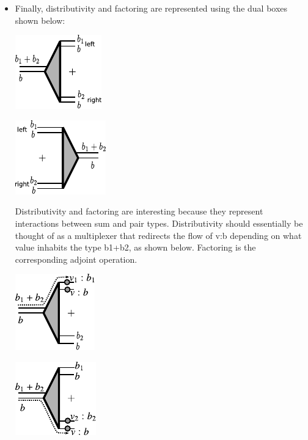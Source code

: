 \documentclass[preprint]{sigplanconf}
\begin{document}
\begin{itemize}
\item Finally, distributivity and factoring are represented using the dual
  boxes shown below:
\begin{multicols}{2}
\begin{center}
  \includegraphics{diagrams/thesis/dist.pdf}
\end{center}
\begin{center}
  \includegraphics{diagrams/thesis/factor.pdf}
\end{center}
\end{multicols}


Distributivity and factoring are interesting because they represent
interactions between sum and pair types. Distributivity should
essentially be thought of as a multiplexer that redirects the flow of
{{v:b}} depending on what value inhabits the type {{b1+b2}}, as shown
below. Factoring is the corresponding adjoint operation.

\begin{multicols}{2}
\begin{center}
  \includegraphics{diagrams/thesis/dist-wire-value1.pdf}
\end{center}
\begin{center}
  \includegraphics{diagrams/thesis/dist-wire-value2.pdf}
\end{center}
\end{multicols}


\end{itemize}
\end{document}
